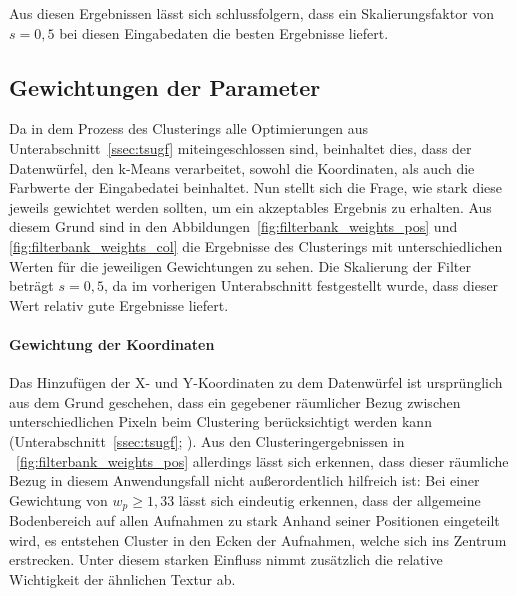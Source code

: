 Aus diesen Ergebnissen lässt sich schlussfolgern, dass ein Skalierungsfaktor von $s=0,5$ bei diesen Eingabedaten die besten Ergebnisse liefert.

\subsection{Gewichtungen der Parameter}
\label{ssec:filterweight}

Da in dem Prozess des Clusterings alle Optimierungen aus Unterabschnitt~\ref{ssec:tsugf} miteingeschlossen sind, beinhaltet dies, dass der Datenwürfel, den k-Means verarbeitet, sowohl die Koordinaten, als auch die Farbwerte der Eingabedatei beinhaltet. Nun stellt sich die Frage, wie stark diese jeweils gewichtet werden sollten, um ein akzeptables Ergebnis zu erhalten. Aus diesem Grund sind in den Abbildungen~\ref{fig:filterbank_weights_pos} und \ref{fig:filterbank_weights_col} die Ergebnisse des Clusterings mit unterschiedlichen Werten für die jeweiligen Gewichtungen zu sehen. Die Skalierung der Filter beträgt $s=0,5$, da im vorherigen Unterabschnitt festgestellt wurde, dass dieser Wert relativ gute Ergebnisse liefert.

\paragraph{Gewichtung der Koordinaten}
Das Hinzufügen der X- und Y-Koordinaten zu dem Datenwürfel ist ursprünglich aus dem Grund geschehen, dass ein gegebener räumlicher Bezug zwischen unterschiedlichen Pixeln beim Clustering berücksichtigt werden kann (\vgl Unterabschnitt~\ref{ssec:tsugf}; \cite{jain_91}). Aus den Clusteringergebnissen in \figurename~\ref{fig:filterbank_weights_pos} allerdings lässt sich erkennen, dass dieser räumliche Bezug in diesem Anwendungsfall nicht außerordentlich hilfreich ist: Bei einer Gewichtung von $w_p\geq1,33$ lässt sich eindeutig erkennen, dass der allgemeine Bodenbereich auf allen Aufnahmen zu stark Anhand seiner Positionen eingeteilt wird, es entstehen Cluster in den Ecken der Aufnahmen, welche sich ins Zentrum erstrecken. Unter diesem starken Einfluss nimmt zusätzlich die relative Wichtigkeit der ähnlichen Textur ab.

